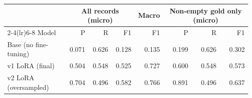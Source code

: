 \begin{tabular}{lrrrrrrr}\toprule
 & \multicolumn{3}{c}{All records (micro)} & Macro & \multicolumn{3}{c}{Non-empty gold only (micro)} \\
\cmidrule(lr){2-4}\cmidrule(lr){6-8}
Model & P & R & F1 & F1 & P & R & F1 \\ \midrule
Base (no fine-tuning) & 0.071 & 0.626 & 0.128 & 0.135 & 0.199 & 0.626 & 0.302 \\
v1 LoRA (final) & 0.504 & 0.548 & 0.525 & 0.727 & 0.600 & 0.548 & 0.573 \\
v2 LoRA (oversampled) & 0.704 & 0.496 & 0.582 & 0.766 & 0.891 & 0.496 & 0.637 \\
\bottomrule\end{tabular}
